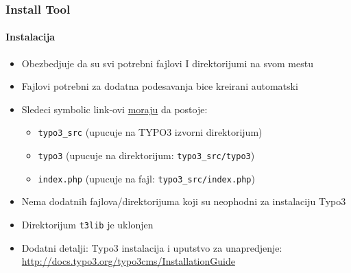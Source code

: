 
\begin{frame}[fragile]

	\frametitle{Install Tool}
	\framesubtitle{Instalacija}

	\begin{itemize}
		\item Obezbedjuje da su svi potrebni fajlovi I direktorijumi na svom mestu
		\item Fajlovi potrebni za dodatna podesavanja bice kreirani automatski
		\item Sledeci symbolic link-ovi \underline{moraju} da postoje:

		\begin{itemize}
			\item \texttt{typo3\_src}	\tabto{2cm} (upucuje na TYPO3 izvorni direktorijum)
			\item \texttt{typo3}		\tabto{2cm} (upucuje na direktorijum: \texttt{typo3\_src/typo3})
			\item \texttt{index.php}	\tabto{2cm} (upucuje na fajl: \texttt{typo3\_src/index.php})
		\end{itemize}

		\item Nema dodatnih fajlova/direktorijuma koji su neophodni za instalaciju Typo3
		\item Direktorijum \texttt{t3lib} je uklonjen
		\item Dodatni detalji: Typo3 instalacija i uputstvo za unapredjenje:\newline
			\url{http://docs.typo3.org/typo3cms/InstallationGuide}

	\end{itemize}

\end{frame}



